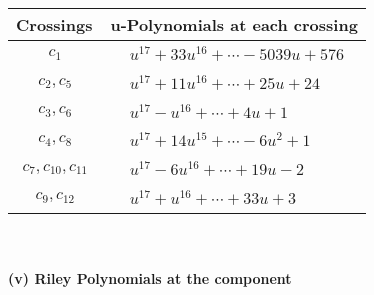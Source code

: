 \documentclass[1p]{elsarticle_modified}
\theoremstyle{definition}
\begin{document}
\begin{tabular}{m{50pt}|m{274pt}}
Crossings & \hspace{64pt}u-Polynomials at each crossing \\
\hline $$\begin{aligned}c_{1}\end{aligned}$$&$\begin{aligned}
&u^{17}+33 u^{16}+\cdots-5039 u+576
\end{aligned}$\\
\hline $$\begin{aligned}c_{2},c_{5}\end{aligned}$$&$\begin{aligned}
&u^{17}+11 u^{16}+\cdots+25 u+24
\end{aligned}$\\
\hline $$\begin{aligned}c_{3},c_{6}\end{aligned}$$&$\begin{aligned}
&u^{17}- u^{16}+\cdots+4 u+1
\end{aligned}$\\
\hline $$\begin{aligned}c_{4},c_{8}\end{aligned}$$&$\begin{aligned}
&u^{17}+14 u^{15}+\cdots-6 u^2+1
\end{aligned}$\\
\hline $$\begin{aligned}c_{7},c_{10},c_{11}\end{aligned}$$&$\begin{aligned}
&u^{17}-6 u^{16}+\cdots+19 u-2
\end{aligned}$\\
\hline $$\begin{aligned}c_{9},c_{12}\end{aligned}$$&$\begin{aligned}
&u^{17}+u^{16}+\cdots+33 u+3
\end{aligned}$\\
\hline
\end{tabular}\\~\\
\newpage\renewcommand{\arraystretch}{1}
\flushleft \textbf{(v) Riley Polynomials at the component}\newline \\
\end{document}
